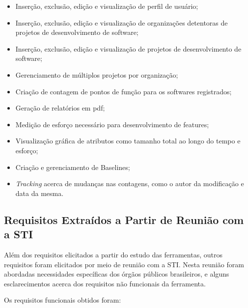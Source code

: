 \begin{itemize}

\item Inserção, exclusão, edição e visualização de perfil de usuário;

\item Inserção, exclusão, edição e visualização de organizações detentoras de
projetos de desenvolvimento de software;

\item Inserção, exclusão, edição e visualização de projetos de desenvolvimento de software;

\item Gerenciamento de múltiplos projetos por organização;

\item Criação de contagem de pontos de função para os softwares registrados;

\item Geração de relatórios em pdf;

\item Medição de esforço necessário para desenvolvimento de features;

\item Visualização gráfica de atributos como tamanho total ao longo do tempo e
esforço;

\item Criação e gerenciamento de Baselines;

\item \textit{Tracking} acerca de mudanças nas contagens, como o autor da modificação e data da mesma.

\end{itemize}

\subsection{Requisitos Extraídos a Partir de Reunião com a STI}

Além dos requisitos elicitados a partir do estudo das ferramentas, outros requisitos foram elicitados por meio de reunião com a STI. Nesta reunião foram abordadas necessidades específicas dos órgãos públicos brasileiros, e alguns esclarecimentos acerca dos requisitos não funcionais da ferramenta.

Os requisitos funcionais obtidos foram:

